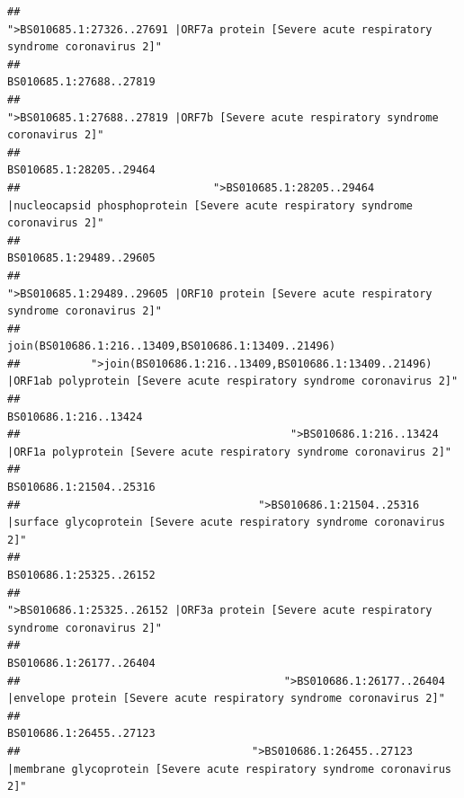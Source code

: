 \documentclass[
]{article}
\begin{document}
\begin{verbatim}
##                                            ">BS010685.1:27326..27691 |ORF7a protein [Severe acute respiratory syndrome coronavirus 2]" 
##                                                                                                                BS010685.1:27688..27819 
##                                                    ">BS010685.1:27688..27819 |ORF7b [Severe acute respiratory syndrome coronavirus 2]" 
##                                                                                                                BS010685.1:28205..29464 
##                              ">BS010685.1:28205..29464 |nucleocapsid phosphoprotein [Severe acute respiratory syndrome coronavirus 2]" 
##                                                                                                                BS010685.1:29489..29605 
##                                            ">BS010685.1:29489..29605 |ORF10 protein [Severe acute respiratory syndrome coronavirus 2]" 
##                                                                                    join(BS010686.1:216..13409,BS010686.1:13409..21496) 
##           ">join(BS010686.1:216..13409,BS010686.1:13409..21496) |ORF1ab polyprotein [Severe acute respiratory syndrome coronavirus 2]" 
##                                                                                                                  BS010686.1:216..13424 
##                                          ">BS010686.1:216..13424 |ORF1a polyprotein [Severe acute respiratory syndrome coronavirus 2]" 
##                                                                                                                BS010686.1:21504..25316 
##                                     ">BS010686.1:21504..25316 |surface glycoprotein [Severe acute respiratory syndrome coronavirus 2]" 
##                                                                                                                BS010686.1:25325..26152 
##                                            ">BS010686.1:25325..26152 |ORF3a protein [Severe acute respiratory syndrome coronavirus 2]" 
##                                                                                                                BS010686.1:26177..26404 
##                                         ">BS010686.1:26177..26404 |envelope protein [Severe acute respiratory syndrome coronavirus 2]" 
##                                                                                                                BS010686.1:26455..27123 
##                                    ">BS010686.1:26455..27123 |membrane glycoprotein [Severe acute respiratory syndrome coronavirus 2]" 

\end{verbatim}
\end{document}
